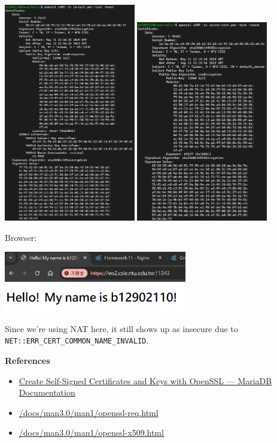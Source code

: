 \documentclass[12pt, a4paper]{article}
\begin{document}
\begin{enumerate}[resume]
\begin{enumerate}
      \includegraphics[width=0.43\textwidth]{12-c_ca-cert.png}
      \includegraphics[width=0.43\textwidth]{12-c_server-cert.png}

      Browser:

      \includegraphics[width=0.6\textwidth]{12-c_browser.png}

      Since we're using NAT here, it still shows up as insecure due to\\
      \verb|NET::ERR_CERT_COMMON_NAME_INVALID|.

      \textbf{References}
      \begin{itemize}
        \item \href{https://mariadb.com/docs/server/security/data-in-transit-encryption/create-self-signed-certificates-keys-openssl/}{Create Self-Signed Certificates and Keys with OpenSSL — MariaDB Documentation}
        \item \href{https://www.openssl.org/docs/man3.0/man1/openssl-req.html}{/docs/man3.0/man1/openssl-req.html}
        \item \href{https://www.openssl.org/docs/man3.0/man1/openssl-x509.html}{/docs/man3.0/man1/openssl-x509.html}
      \end{itemize}


\end{enumerate}
\end{enumerate}
\end{document}
